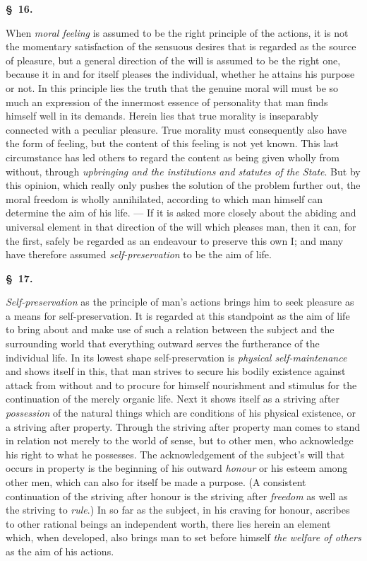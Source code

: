 \documentclass[12pt]{article}
\newcommand{\opage}[1]{\marginnote{\footnotesize\textit{[#1]}}}
\newcommand{\slaw}[1]{\par\medskip\begin{center}\textbf{\S~#1.}\end{center}\nopagebreak}
\begin{document}
\slaw{16}
When \emph{moral feeling} is assumed to be the right principle of the actions, it is not the momentary satisfaction of the \opage{149}sensuous desires that is regarded as the source of pleasure, but a general direction of the will is assumed to be the right one, because it in and for itself pleases the individual, whether he attains his purpose or not. In this principle lies the truth that the genuine moral will must be so much an expression of the innermost essence of personality that man finds himself well in its demands. Herein lies that true morality is inseparably connected with a peculiar pleasure. True morality must consequently also have the form of feeling, but the content of this feeling is not yet known. This last circumstance has led others to regard the content as being given wholly from without, through \emph{upbringing and the institutions and statutes of the State}. But by this opinion, which really only pushes the solution of the problem further out, the moral freedom is wholly annihilated, according to which man himself can determine the aim of his life. --- If it is asked more closely about the abiding and universal element in that direction of the will which pleases man, then it can, for the first, safely be regarded as an endeavour to preserve this own I; and many have therefore assumed \emph{self-preservation} to be the aim of life.

\slaw{17}
\emph{Self-preservation} as the principle of man's actions brings him to seek pleasure as a means for self-preservation. It is regarded at this standpoint as the aim of life to bring about and make use of such a relation between the subject and the surrounding world that everything outward serves the furtherance of the individual life. In its lowest shape self-preservation is \emph{physical self-maintenance} and shows itself in this, that man strives to secure his bodily existence against attack from without and to procure for himself nourishment and stimulus for the continuation of the merely organic life. Next it shows itself as a striving after \emph{possession} of the natural things which are conditions of his physical existence, or a striving after \opage{150}property. Through the striving after property man comes to stand in relation not merely to the world of sense, but to other men, who acknowledge his right to what he possesses. The acknowledgement of the subject's will that occurs in property is the beginning of his outward \emph{honour} or his esteem among other men, which can also for itself be made a purpose. (A consistent continuation of the striving after honour is the striving after \emph{freedom} as well as the striving to \emph{rule}.) In so far as the subject, in his craving for honour, ascribes to other rational beings an independent worth, there lies herein an element which, when developed, also brings man to set before himself \emph{the welfare of others} as the aim of his actions.
\end{document}
